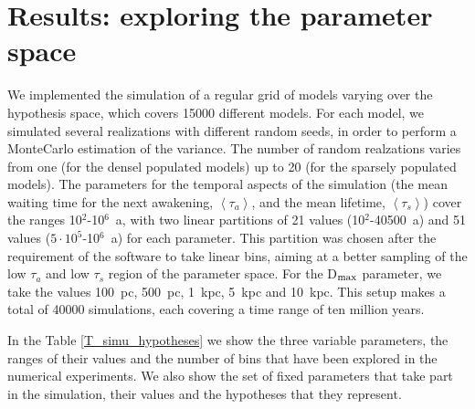 \documentclass[crop]{CSLB}
\newcommand{\ttn}[1]{}
\begin{document}
 


\section{Results: exploring the parameter space}\label{S_results}

We implemented the simulation of a regular grid of models varying over
the hypothesis space, which covers 15000 different models.
%
For each model, we simulated several realizations with different random
seeds, in order to perform a MonteCarlo estimation of the variance.
%
The number of random realzations varies from one (for the densel populated models)
up to 20 (for the sparsely populated models).
%
The parameters for the temporal aspects of the simulation (the mean
waiting time for the next awakening, $\left<\tau_a\right>$, and the
mean lifetime, $\left<\tau_s\right>$) cover the ranges 10$^2$-10$^6$~a, with 
two linear partitions of 21 values (10$^2$-40500~a) and 51 values ($5\cdot10^5$-10$^6$~a)
for each parameter.
%
This partition was chosen after the requirement of the software to take linear bins, 
aiming at a better sampling of the low $\tau_a$ and low $\tau_s$ region of the parameter space.
%
For the D$_{\rm max}$ parameter, we take the 
values 100~pc, 500~pc, 1~kpc, 5~kpc and 10~kpc.
%
This setup makes a total of 40000 simulations, each covering a time
range of ten million years.
%
\ttn{1}
%
In the Table \ref{T_simu_hypotheses} we show the three variable
parameters, the ranges of their values and the number of bins that
have been explored in the numerical experiments.
%
We also show the set of fixed parameters that take part in the simulation,
their values and the hypotheses that they represent.
\end{document}
